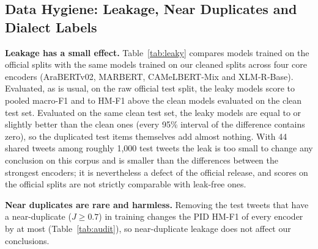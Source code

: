 \documentclass[11pt]{article}
\begin{document}
\subsection{Data Hygiene: Leakage, Near Duplicates and Dialect Labels}
\label{sec:res_hygiene}
\textbf{Leakage has a small effect.} Table~\ref{tab:leaky} compares models trained on the official splits with the same models trained on our cleaned splits across four core encoders (AraBERTv02, MARBERT, CAMeLBERT-Mix and XLM-R-Base). Evaluated, as is usual, on the raw official test split, the leaky models score \leakInflPooledMin{} to \leakInflPooledMax{} pooled macro-F1 and \leakInflMin{} to \leakInflMax{} HM-F1 above the clean models evaluated on the clean test set. Evaluated on the same clean test set, the leaky models are equal to or slightly better than the clean ones (every 95\% interval of the difference contains zero), so the duplicated test items themselves add almost nothing. With 44 shared tweets among roughly 1,000 test tweets the leak is too small to change any conclusion on this corpus and is smaller than the differences between the strongest encoders; it is nevertheless a defect of the official release, and scores on the official splits are not strictly comparable with leak-free ones.

\begin{table}[tbp]
\caption{Effect of the train--test duplicates in the official ArSarcasm splits (PID, mean over five seeds). ``Leaky'' models are trained on the official training split with its duplicates; ``clean'' models on our deduplicated split. Inflation = leaky on raw test $-$ clean on clean test.}
\label{tab:leaky}
\centering
\footnotesize
{}
\end{table}

\textbf{Near duplicates are rare and harmless.} Removing the \ndSeven{} test tweets that have a near-duplicate ($J\ge0.7$) in training changes the PID HM-F1 of every encoder by at most \ndDeltaMaxAbs{} (Table~\ref{tab:audit}), so near-duplicate leakage does not affect our conclusions.
\end{document}
